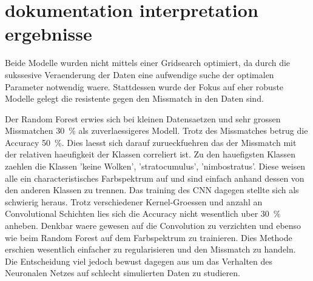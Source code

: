\section{dokumentation interpretation ergebnisse}
\label{sec:04_dokumentation_interpretation_ergebnisse}

Beide Modelle wurden nicht mittels einer Gridsearch optimiert, da durch die
sukssesive Veraenderung der Daten eine aufwendige suche der optimalen Parameter
notwendig waere.
Stattdessen wurde der Fokus auf eher robuste Modelle gelegt die resistente gegen
den Missmatch in den Daten sind.

Der Random Forest erwies sich bei kleinen Datensaetzen und sehr grossen
Missmatchen \SI{30}{\percent} als zuverlaessigeres Modell.
Trotz des Missmatches betrug die Accuracy \SI{50}{\percent}. 
Dies laesst sich darauf zurueckfuehren das der Missmatch mit der relativen
haeufigkeit der Klassen correliert ist. 
Zu den hauefigsten Klassen zaehlen die Klassen 'keine Wolken', 'stratocumulus',
'nimbostratus'. 
Diese weisen alle ein characteristisches Farbspektrum auf und sind einfach
anhand dessen von den anderen Klassen zu trennen.
Das training des CNN dagegen stellte sich als schwierig heraus. 
Trotz verschiedener Kernel-Groessen und anzahl an Convolutional Schichten lies
sich die Accuracy nicht wesentlich uber \SI{30}{\percent} anheben. 
Denkbar waere gewesen auf die Convolution zu verzichten und ebenso wie beim
Random Forest auf dem Farbspektrum zu trainieren.
Dies Methode erschien wesentlich einfacher zu regularisieren und den Missmatch
zu handeln.
Die Entscheidung viel jedoch bewust dagegen aus um das Verhalten des Neuronalen Netzes
auf schlecht simulierten Daten zu studieren. 

